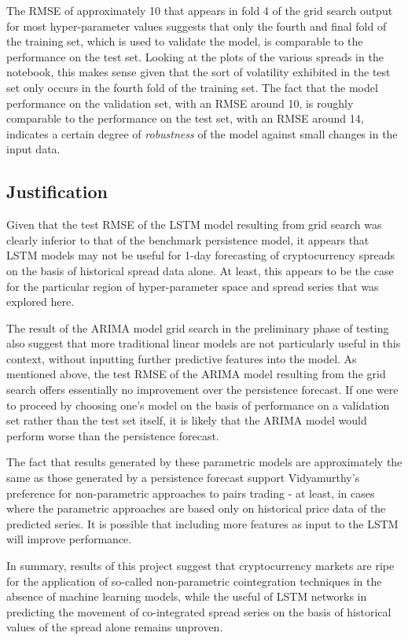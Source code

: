 \documentclass{article}
\begin{document}
The RMSE of approximately 10 that appears in fold 4 of the grid search output for most hyper-parameter values suggests that only the fourth and final fold of the training set, which is used to validate the model, is comparable to the performance on the test set. Looking at the plots of the various spreads in the notebook, this makes sense given that the sort of volatility exhibited in the test set only occurs in the fourth fold of the training set. The fact that the model performance on the validation set, with an RMSE around 10, is roughly comparable to the performance on the test set, with an RMSE around 14, indicates a certain degree of \textit{robustness} of the model against small changes in the input data. 


\subsection{Justification}

Given that the test RMSE of the LSTM model resulting from grid search was clearly inferior to that of the benchmark persistence model, it appears that LSTM models may not be useful for 1-day forecasting of cryptocurrency spreads on the basis of historical spread data alone. At least, this appears to be the case for the particular region of hyper-parameter space and spread series that was explored here. 

The result of the ARIMA model grid search in the preliminary phase of testing also suggest that more traditional linear models are not particularly useful in this context, without inputting further predictive features into the model. As mentioned above, the test RMSE of the ARIMA model resulting from the grid search offers essentially no improvement over the persistence forecast. If one were to proceed by choosing one's model on the basis of performance on a validation set rather than the test set itself, it is likely that the ARIMA model would perform worse than the persistence forecast.  

The fact that results generated by these parametric models are approximately the same as those generated by a persistence forecast support Vidyamurthy's preference for non-parametric approaches to pairs trading - at least, in cases where the parametric approaches are based only on historical price data of the predicted series. It is possible that including more features as input to the LSTM will improve performance. 

In summary, results of this project suggest that cryptocurrency markets are ripe for the application of so-called non-parametric cointegration techniques in the absence of machine learning models, while the useful of LSTM networks in predicting the movement of co-integrated spread series on the basis of historical values of the spread alone remains unproven.
\end{document}
